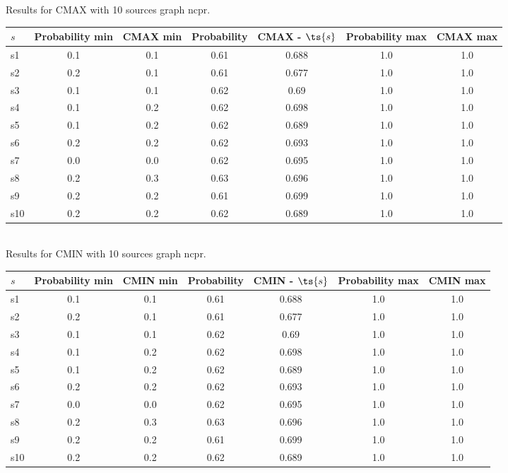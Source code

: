 \documentclass{article}
\begin{document}
\noindent Results for CMAX with 10 sources graph ncpr.

\noindent\begin{tabular}{|l|c|c|c|c|c|c|}
\hline
$s$& Probability min & CMAX min & Probability & CMAX - $\ts{s}$ & Probability max & CMAX max\\
\hline
s1 &0.1 & 0.1 & 0.61 & 0.688 & 1.0 & 1.0\\
\hline
s2 &0.2 & 0.1 & 0.61 & 0.677 & 1.0 & 1.0\\
\hline
s3 &0.1 & 0.1 & 0.62 & 0.69 & 1.0 & 1.0\\
\hline
s4 &0.1 & 0.2 & 0.62 & 0.698 & 1.0 & 1.0\\
\hline
s5 &0.1 & 0.2 & 0.62 & 0.689 & 1.0 & 1.0\\
\hline
s6 &0.2 & 0.2 & 0.62 & 0.693 & 1.0 & 1.0\\
\hline
s7 &0.0 & 0.0 & 0.62 & 0.695 & 1.0 & 1.0\\
\hline
s8 &0.2 & 0.3 & 0.63 & 0.696 & 1.0 & 1.0\\
\hline
s9 &0.2 & 0.2 & 0.61 & 0.699 & 1.0 & 1.0\\
\hline
s10 &0.2 & 0.2 & 0.62 & 0.689 & 1.0 & 1.0\\
\hline
\end{tabular}\\

\noindent Results for CMIN with 10 sources graph ncpr.

\noindent\begin{tabular}{|l|c|c|c|c|c|c|}
\hline
$s$& Probability min & CMIN min & Probability & CMIN - $\ts{s}$ & Probability max & CMIN max\\
\hline
s1 &0.1 & 0.1 & 0.61 & 0.688 & 1.0 & 1.0\\
\hline
s2 &0.2 & 0.1 & 0.61 & 0.677 & 1.0 & 1.0\\
\hline
s3 &0.1 & 0.1 & 0.62 & 0.69 & 1.0 & 1.0\\
\hline
s4 &0.1 & 0.2 & 0.62 & 0.698 & 1.0 & 1.0\\
\hline
s5 &0.1 & 0.2 & 0.62 & 0.689 & 1.0 & 1.0\\
\hline
s6 &0.2 & 0.2 & 0.62 & 0.693 & 1.0 & 1.0\\
\hline
s7 &0.0 & 0.0 & 0.62 & 0.695 & 1.0 & 1.0\\
\hline
s8 &0.2 & 0.3 & 0.63 & 0.696 & 1.0 & 1.0\\
\hline
s9 &0.2 & 0.2 & 0.61 & 0.699 & 1.0 & 1.0\\
\hline
s10 &0.2 & 0.2 & 0.62 & 0.689 & 1.0 & 1.0\\
\hline
\end{tabular}\\
\end{document}
